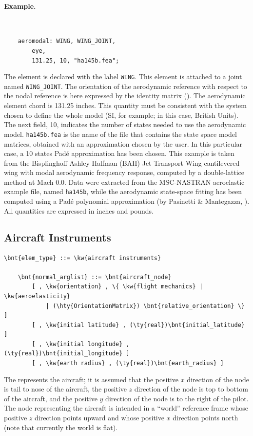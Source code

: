 \paragraph{Example.} \
\begin{verbatim}
    aeromodal: WING, WING_JOINT,
        eye,
        131.25, 10, "ha145b.fea";
\end{verbatim}
The  element is declared with the label \texttt{WING}.
This element is attached to a \kw{modal} joint
named \texttt{WING\_JOINT}.
The orientation of the aerodynamic reference with respect
to the nodal reference is here expressed by the identity matrix ().
The aerodynamic element chord is 131.25 inches.
This quantity must be consistent with the system chosen to define
the whole model (SI, for example; in this case, British Units).
The next field, 10, indicates the number of states needed to use
the aerodynamic model.
\texttt{ha145b.fea} is the name of the file that contains
the state space model matrices, obtained with an approximation
chosen by the user.
In this particular case, a 10 states Pad\'e approximation
has been chosen.
This example is taken from the Bisplinghoff Ashley Halfman
(BAH) Jet Transport Wing cantilevered wing with modal aerodynamic
frequency response, computed by a double-lattice method at Mach 0.0.
Data were extracted from the MSC-NASTRAN aeroelastic example file,
named \texttt{ha145b}, while the aerodynamic state-space fitting
has been computed using a Pad\'e polynomial approximation
(by Pasinetti \& Mantegazza, \cite{PASINETTI-MANTEGAZZA-1999}).
All quantities are expressed in inches and pounds.



\subsection{Aircraft Instruments}\label{sec:EL:AERO:AIRCRAFTINSTRUMENTS}
\begin{Verbatim}[commandchars=\\\{\}]
    \bnt{elem_type} ::= \kw{aircraft instruments}

    \bnt{normal_arglist} ::= \bnt{aircraft_node}
        [ , \kw{orientation} , \{ \kw{flight mechanics} | \kw{aeroelasticity}
            | (\hty{OrientationMatrix}) \bnt{relative_orientation} \} ]
	    [ , \kw{initial latitude} , (\ty{real})\bnt{initial_latitude} ]
	    [ , \kw{initial longitude} , (\ty{real})\bnt{initial_longitude} ]
	    [ , \kw{earth radius} , (\ty{real})\bnt{earth_radius} ]
\end{Verbatim}
The  represents the aircraft; it is assumed
that the positive $x$ direction of the node is tail to nose of the aircraft,
the positive $z$ direction of the node is top to bottom of the aircraft,
and the positive $y$ direction of the node is to the right of the pilot.
The node representing the aircraft is intended in a ``world''
reference frame whose positive $z$ direction points upward
and whose positive $x$ direction points north
(note that currently the world is flat).

